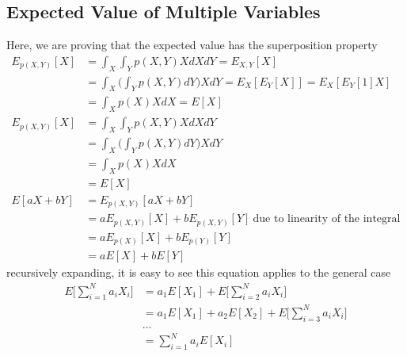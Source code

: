 \documentclass{article}
\numberwithin{equation}{subsection}
\begin{document}
\subsection{Expected Value of Multiple Variables}
\label{multi_mean_derivation}
Here, we are proving that the expected value has the superposition property
\begin{align}
     E_{p(X,Y)}[X] 
     &= \int_X\int_Y p(X,Y)X dX dY = E_{X,Y}[X]\\
     &= \int_X\Big(\int_Y p(X,Y)dY\Big) X dY = E_{X}[E_{Y}[X]] = E_{X}[E_{Y}[1]X]\\
     &= \int_X p(X) X dX = E[X]\\
     E_{p(X,Y)}[X] 
     &= \int_X\int_Y p(X,Y)X dX dY\\
     &= \int_X\Big(\int_Y p(X,Y)dY\Big) X dY\\
     &= \int_X p(X) X dX\\
     &= E[X]\\
    E[aX+bY] 
    &= E_{p(X,Y)}[aX+bY]\\
    &= aE_{p(X,Y)}[X]+bE_{p(X,Y)}[Y]\ \text{due to linearity of the integral}\\
    &= aE_{p(X)}[X]+bE_{p(Y)}[Y]\\
    &= aE[X]+bE[Y]
\end{align}
recursively expanding, it is easy to see this equation applies to the general case
\begin{align}
    E\big[\sum_{i=1}^N a_iX_i\big] &= a_1E[X_1]+E\big[\sum_{i=2}^N a_iX_i\big]\\
    &= a_1E[X_1]+a_2E[X_2]+E\big[\sum_{i=3}^N a_iX_i\big]\\
    & ...\\
    &= \sum_{i=1}^N a_iE[X_i]~\label{mean_superpos}
\end{align}
\end{document}
